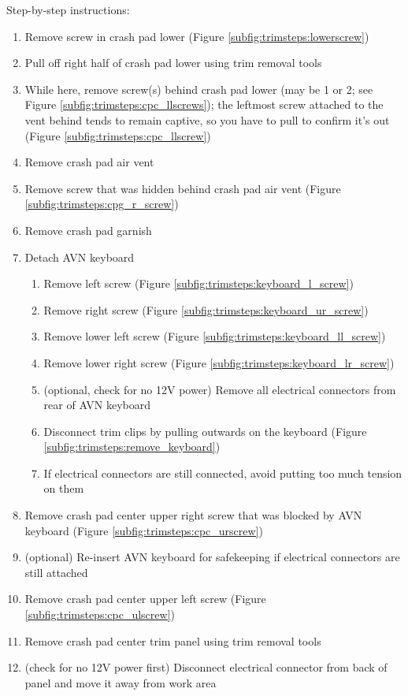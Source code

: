 \documentclass[superscriptaddress,onecolumn,floatfix]{revtex4-2}
\begin{document}
Step-by-step instructions:
\begin{enumerate}
  \item Remove screw in crash pad lower (Figure \ref{subfig:trimsteps:lowerscrew})
  \item Pull off right half of crash pad lower using trim removal tools
  \item While here, remove screw(s) behind crash pad lower (may be 1 or 2; see Figure \ref{subfig:trimsteps:cpc_llscrews}); the leftmost screw attached to the vent behind tends to remain captive, so you have to pull to confirm it's out (Figure \ref{subfig:trimsteps:cpc_llscrew})
  \item Remove crash pad air vent
  \item Remove screw that was hidden behind crash pad air vent (Figure \ref{subfig:trimsteps:cpg_r_screw})
  \item Remove crash pad garnish
  \item Detach AVN keyboard 
    \begin{enumerate}
      \item Remove left screw (Figure \ref{subfig:trimsteps:keyboard_l_screw})
      \item Remove right screw (Figure \ref{subfig:trimsteps:keyboard_ur_screw})
      \item Remove lower left screw (Figure \ref{subfig:trimsteps:keyboard_ll_screw})
      \item Remove lower right screw (Figure \ref{subfig:trimsteps:keyboard_lr_screw})
      \item (optional, check for no 12V power) Remove all electrical connectors from rear of AVN keyboard
      \item Disconnect trim clips by pulling outwards on the keyboard (Figure \ref{subfig:trimsteps:remove_keyboard})
      \item If electrical connectors are still connected, avoid putting too much tension on them
    \end{enumerate}
  \item Remove crash pad center upper right screw that was blocked by AVN keyboard (Figure \ref{subfig:trimsteps:cpc_urscrew})
  \item (optional) Re-insert AVN keyboard for safekeeping if electrical connectors are still attached
  \item Remove crash pad center upper left screw (Figure \ref{subfig:trimsteps:cpc_ulscrew})
  \item Remove crash pad center trim panel using trim removal tools
  \item (check for no 12V power first) Disconnect electrical connector from back of panel and move it away from work area
\end{enumerate}
\end{document}
